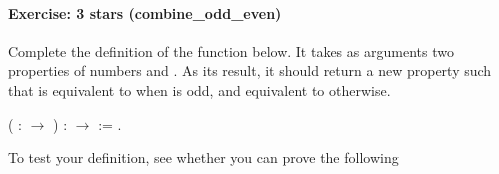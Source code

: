 \documentclass[12pt]{report}
\begin{document}
\paragraph{Exercise: 3 stars (combine\_odd\_even)}

 Complete the definition of the  function
    below. It takes as arguments two properties of numbers  and
    . As its result, it should return a new property  such
    that   is equivalent to   when  is odd, and
    equivalent to   otherwise. \begin{coqdoccode}
\coqdocemptyline
\coqdocnoindent
{}  (  :  \ensuremath{\rightarrow} ) :  \ensuremath{\rightarrow}  :=\coqdoceol
\coqdocindent{1.00em}
 .\coqdoceol
\coqdocemptyline
\end{coqdoccode}
To test your definition, see whether you can prove the following
\end{document}
